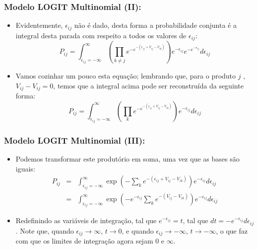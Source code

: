 \documentclass{beamer}
\begin{document}
\begin{frame}\frametitle{Modelo LOGIT Multinomial (II):}


\begin{itemize}
\item Evidentemente, $\epsilon_{ij}$ não é dado, desta forma a probabilidade
conjunta é a integral desta parada com respeito a todos os valores
de $\epsilon_{ij}$:
\[
P_{ij}=\int_{\epsilon_{ij}=-\infty}^{\infty}\left(\prod_{k\neq j}e^{-e^{-(\epsilon_{ij}+V_{ij}-V_{ik})}}\right)e^{-\epsilon_{ij}}e^{-e^{-\epsilon_{ij}}}d\epsilon_{ij}
\]
\item Vamos cozinhar um pouco esta equação; lembrando que, para o produto
$j$ , $V_{ij}-V_{ij}=0$, temos que a integral acima pode ser reconstruída
da seguinte forma:
\[
P_{ij}=\int_{\epsilon_{ij}=-\infty}^{\infty}\left(\prod_{k}e^{-e^{-(\epsilon_{ij}+V_{ij}-V_{ik})}}\right)e^{-\epsilon_{ij}}d\epsilon_{ij}
\]
\end{itemize}
\end{frame}

\begin{frame}\frametitle{Modelo LOGIT Multinomial (III):}


\begin{itemize}
\item Podemos transformar este produtório em soma, uma vez que as bases
são iguais:
\begin{eqnarray*}
P_{ij} & = & \int_{\epsilon_{ij}=-\infty}^{\infty}\exp\left(-\sum_{k}e^{-(\epsilon_{ij}+V_{ij}-V_{ik})}\right)e^{-\epsilon_{ij}}d\epsilon_{ij}\\
 & = & \int_{\epsilon_{ij}=-\infty}^{\infty}\exp\left(-e^{-\epsilon_{ij}}\sum_{k}e^{-(V_{ij}-V_{ik})}\right)e^{-\epsilon_{ij}}d\epsilon_{ij}
\end{eqnarray*}
\item Redefinindo as variáveis de integração, tal que $e^{-\epsilon_{ij}}=t$,
tal que $dt=-e^{-\epsilon_{ij}}d\epsilon_{ij}$. Note que, quando
$\epsilon_{ij}\rightarrow\infty$, $t\rightarrow0$, e quando $\epsilon_{ij}\rightarrow-\infty$,
$t\rightarrow-\infty$, o que faz com que os limites de integração
agora sejam 0 e $\infty$. 
\end{itemize}
\end{frame}
\end{document}
